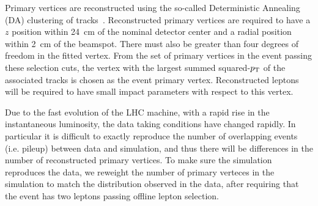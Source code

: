 Primary vertices are reconstructed using the so-called Deterministic Annealing (DA) 
clustering of tracks~\cite{PVDA}. Reconstructed primary vertices are required to have a
$z$ position within 24~cm of the nominal detector center and a radial position within 
2~cm of the beamspot. There must also be greater than four degrees of freedom in
the fitted vertex. From the set of primary vertices in the event passing these
selection cuts, the vertex with the largest summed squared-$p_\mathrm{T}$ of the associated
tracks is chosen as the event primary vertex. Reconstructed leptons will be required 
to have small impact parameters with respect to this vertex.

Due to the fast evolution of the LHC machine, with a rapid rise in the
instantaneous luminosity, the data taking conditions have changed
rapidly.  In particular it is difficult to exactly reproduce the
number of overlapping events (i.e. pileup) between data and
simulation, and thus there will be differences in the number of
reconstructed primary vertices. 
To make sure the simulation reproduces the data, we reweight the number of
primary verteces in the simulation to match the distribution observed in the 
data, after requiring that the event has two leptons passing offline
lepton selection.
